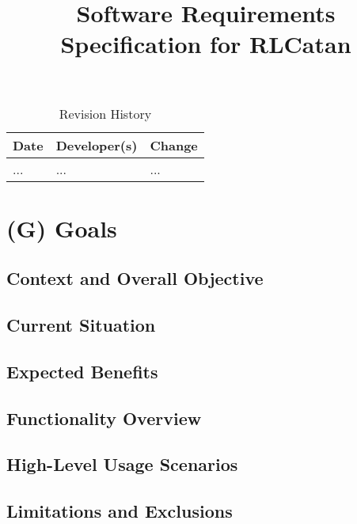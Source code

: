 \documentclass{article}
\title{Software Requirements Specification for RLCatan\\\progname}
\author{\authname}
\date{}
\begin{document}
\maketitle

\begin{table}[hp]
\caption{Revision History} \label{TblRevisionHistory}
\begin{tabularx}{\textwidth}{llX}
\toprule
\textbf{Date} & \textbf{Developer(s)} & \textbf{Change}\\
\midrule
... & ... & ...\\
\bottomrule
\end{tabularx}
\end{table}

\section*{(G) Goals}\label{sec:srs-goals}
\renewcommand{\thesubsection}{G.\arabic{subsection}}

\subsection{Context and Overall Objective}\label{subsec:context-and-overall-objective}

\subsection{Current Situation}\label{subsec:current-situation}

\subsection{Expected Benefits}\label{subsec:expected-benefits}

\subsection{Functionality Overview}\label{subsec:functionality-overview}

\subsection{High-Level Usage Scenarios}\label{subsec:high-level-usage-scenarios}

\subsection{Limitations and Exclusions}\label{subsec:limitations-and-exclusions}
\end{document}
